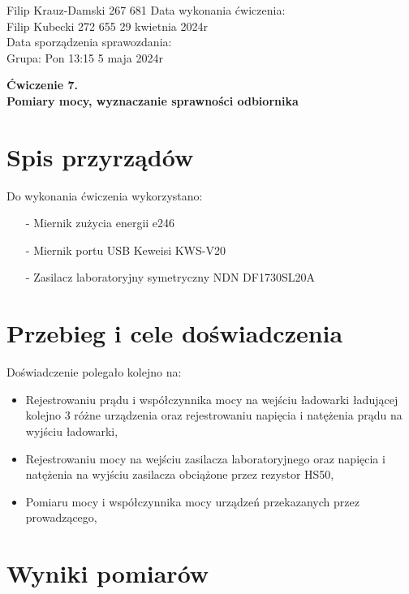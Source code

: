 \documentclass[11pt]{article}
\begin{document}
    \begin{flushleft}
        Filip Krauz-Damski 267 681 \hfill Data wykonania ćwiczenia:\\
        Filip Kubecki 272 655 \hfill 29 kwietnia 2024r\\
        \hfill Data sporządzenia sprawozdania:\\
        Grupa: Pon 13:15 \hfill 5 maja 2024r\\
    \end{flushleft}
    \begin{center}
        \Large\textbf{Ćwiczenie 7.}\\
        \textbf{Pomiary mocy, wyznaczanie sprawności odbiornika}
    \end{center}
    \vspace{2cm}
    \section{Spis przyrządów}
    \par{
        Do wykonania ćwiczenia wykorzystano:
        \begin{itemize}
            \setlength\itemsep{0em}
            \item[-] Miernik zużycia energii e246
            \item[-] Miernik portu USB Keweisi KWS-V20
            \item[-] Zasilacz laboratoryjny symetryczny NDN DF1730SL20A
        \end{itemize}
    }

    \section{Przebieg i cele doświadczenia}
    Doświadczenie polegało kolejno na:
    \begin{itemize}
        \setlength\itemsep{0em}
        \item Rejestrowaniu prądu i współczynnika mocy na wejściu ładowarki ładującej kolejno 3 różne urządzenia oraz rejestrowaniu napięcia i natężenia prądu na wyjściu ładowarki,
        \item Rejestrowaniu mocy na wejściu zasilacza laboratoryjnego oraz napięcia i natężenia na wyjściu zasilacza
        obciążone przez rezystor HS50,
        \item Pomiaru mocy i współczynnika mocy urządzeń przekazanych przez prowadzącego,
    \end{itemize}
    \newpage
    \section{Wyniki pomiarów}
\end{document}
